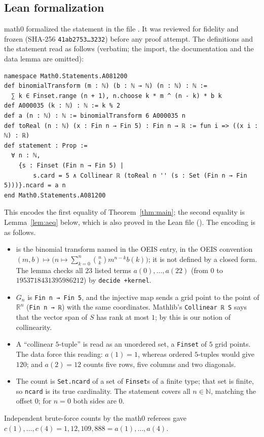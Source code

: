 \documentclass[11pt]{amsart}
\theoremstyle{plain}
\theoremstyle{definition}
\newcommand{\N}{\mathbb{N}}
\newcommand{\R}{\mathbb{R}}
\begin{document}
\subsection*{Lean formalization}
math0 formalized the statement in the file . It was reviewed for fidelity and frozen (SHA-256 \texttt{41ab2753\ldots 3232}) before any proof attempt. The definitions and the statement read as follows (verbatim; the import, the documentation and the data lemma  are omitted):
\begin{lstlisting}
namespace Math0.Statements.A081200
def binomialTransform (m : ℕ) (b : ℕ → ℕ) (n : ℕ) : ℕ :=
  ∑ k ∈ Finset.range (n + 1), n.choose k * m ^ (n - k) * b k
def A000035 (k : ℕ) : ℕ := k % 2
def a (n : ℕ) : ℕ := binomialTransform 6 A000035 n
def toReal (n : ℕ) (x : Fin n → Fin 5) : Fin n → ℝ := fun i => ((x i : ℕ) : ℝ)
def statement : Prop :=
  ∀ n : ℕ,
    {s : Finset (Fin n → Fin 5) |
        s.card = 5 ∧ Collinear ℝ (toReal n '' (s : Set (Fin n → Fin 5)))}.ncard = a n
end Math0.Statements.A081200
\end{lstlisting}
This encodes the first equality of Theorem~\ref{thm:main}; the second equality is Lemma~\ref{lem:aeq} below, which is also proved in the Lean file (). The encoding is as follows.
\begin{itemize}
\item {} is the binomial transform named in the OEIS entry, in the OEIS convention $(m,b)\mapsto\bigl(n\mapsto\sum_{k=0}^n\binom nk m^{n-k}b(k)\bigr)$; it is not defined by a closed form. The lemma  checks all $23$ listed terms $a(0),\dots,a(22)$ (from $0$ to $1953718431395986212$) by \texttt{decide +kernel}.
\item $G_n$ is \texttt{Fin n → Fin 5}, and the injective map  sends a grid point to the point of $\R^n$ (\texttt{Fin n → ℝ}) with the same coordinates. Mathlib's \texttt{Collinear ℝ S} says that the vector span of $S$ has rank at most $1$; by  this is our notion of collinearity.
\item A ``collinear $5$-tuple'' is read as an unordered set, a \texttt{Finset} of $5$ grid points. The data force this reading: $a(1)=1$, whereas ordered $5$-tuples would give $120$; and $a(2)=12$ counts five rows, five columns and two diagonals.
\item The count is \texttt{Set.ncard} of a set of \texttt{Finset}s of a finite type; that set is finite, so \texttt{ncard} is its true cardinality. The statement covers all $n\in\N$, matching the offset $0$; for $n=0$ both sides are $0$.
\end{itemize}
Independent brute-force counts by the math0 referees gave $c(1),\dots,c(4)=1,12,109,888=a(1),\dots,a(4)$.
\end{document}
